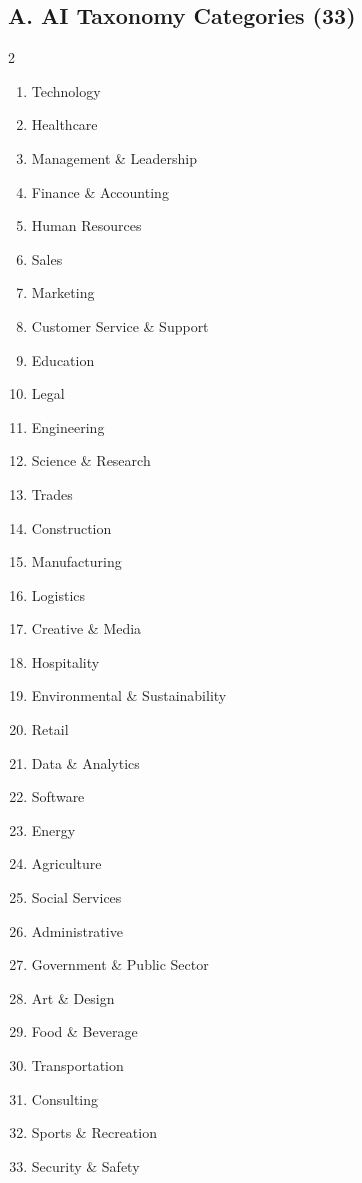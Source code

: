 \documentclass[11pt, a4paper]{article}
\begin{document}
\subsection{A. AI Taxonomy Categories (33)}

\begin{multicols}{2}
\begin{enumerate}[leftmargin=1.5em, itemsep=0pt, parsep=1pt]\small
    \item Technology \item Healthcare \item Management \& Leadership
    \item Finance \& Accounting \item Human Resources \item Sales
    \item Marketing \item Customer Service \& Support \item Education
    \item Legal \item Engineering \item Science \& Research \item Trades
    \item Construction \item Manufacturing \item Logistics
    \item Creative \& Media \item Hospitality
    \item Environmental \& Sustainability \item Retail
    \item Data \& Analytics \item Software \item Energy \item Agriculture
    \item Social Services \item Administrative
    \item Government \& Public Sector \item Art \& Design
    \item Food \& Beverage \item Transportation \item Consulting
    \item Sports \& Recreation \item Security \& Safety
\end{enumerate}
\end{multicols}
\end{document}
